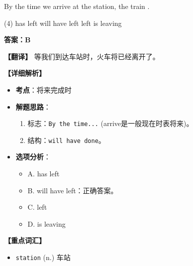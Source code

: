 \documentclass[11pt, a4paper]{article}
\newcommand{\analysis}[4]{
    \begin{solutionbox}
        \textbf{答案：#1}
        
        \textbf{【翻译】} #2
        
        \textbf{【详细解析】}
        #3
        
        \textbf{【重点词汇】}
        #4
    \end{solutionbox}
}
\newcommand{\blank}{\underline{\hspace{1.5cm}}}
\begin{document}
\begin{questions}
    \item By the time we arrive at the station, the train \blank.
    \begin{tasks}(4)
        \task has left \task will have left \task left \task is leaving
    \end{tasks}
    \analysis{B}{等我们到达车站时，火车将已经离开了。}{
        \begin{itemize}
            \item \textbf{考点}：将来完成时
            \item \textbf{解题思路}：
                \begin{enumerate}
                    \item 标志：\texttt{By the time...} (arrive是一般现在时表将来)。
                    \item 结构：\texttt{will have done}。
                \end{enumerate}
            \item \textbf{选项分析}：
                \begin{itemize}
                    \item A. has left
                    \item B. will have left：正确答案。
                    \item C. left
                    \item D. is leaving
                \end{itemize}
        \end{itemize}
    }{
        \begin{itemize}
            \item \texttt{station} (n.) 车站
        \end{itemize}
    }


\end{questions}
\end{document}
